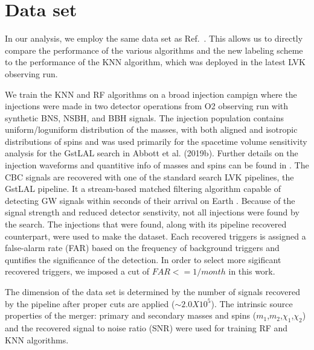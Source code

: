 \section{Data set\label{dataset}}
\label{sec:dataset}

In our analysis, we employ the same data set as Ref.\ . This allows us to directly compare the performance of the various algorithms and the new labeling
scheme to the performance of the \ac{KNN} algorithm, which was deployed in the latest \ac{LVK} observing run. 

We train the \ac{KNN} and \ac{RF} algorithms on a broad injection campign where the injections were made in two detector operations from \ac{O2} observing run with synthetic \ac{BNS}, \ac{NSBH}, and \ac{BBH} signals. The injection population contains uniform/loguniform distribution of the masses, with both aligned and isotropic distributions of spins and was used primarily for the spacetime volume sensitivity analysis for the GstLAL search in Abbott et al. (2019b). Further details on the injection waveforms and quantitive info of masses and spins can be found in . The \ac{CBC} signals are recovered with one of the standard search \ac{LVK} pipelines, the GstLAL pipeline. It a stream-based matched filtering algorithm capable of detecting \ac{GW} signals within seconds of their arrival on Earth . Because of the signal strength and reduced detector senstivity, not all injections were found by the search. The injections that were found, along with its pipeline recovered counterpart, were used to make the dataset. Each recovered triggers is assigned a false-alarm rate (FAR) based on the frequency of background triggers and quntifies the significance of the detection. In order to select more sigificant recovered triggers, we imposed a cut of $FAR <= 1/month$ in this work.  

The dimension of the data set is determined by the number of signals recovered by the pipeline after proper cuts are applied ($\sim2.0X10^5$). The intrinsic source properties of the merger: primary and secondary masses and spins ({$m_1$,$m_2$,$\chi_1$,$\chi_2$}) and the recovered signal to noise ratio (SNR) were used for training RF and KNN algorithms.

